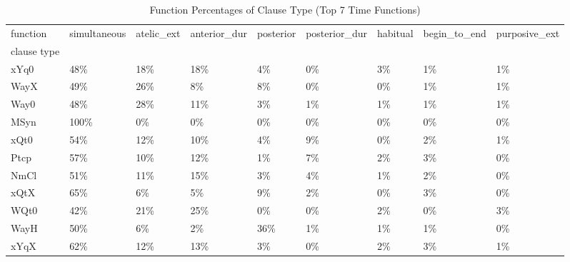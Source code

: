 \begin{table}[htbp!]
\centering
\caption{Function Percentages of Clause Type (Top 7 Time Functions)}
\label{table:type_function_pr}
\begin{adjustbox}{width=1\textwidth}
\begin{tabular}{lllllllll}
\toprule
function & simultaneous & atelic\_ext & anterior\_dur & posterior & posterior\_dur & habitual & begin\_to\_end & purposive\_ext \\
clause type &              &            &              &           &               &          &              &               \\
\midrule
xYq0        &          48\% &        18\% &          18\% &        4\% &            0\% &       3\% &           1\% &            1\% \\
WayX        &          49\% &        26\% &           8\% &        8\% &            0\% &       0\% &           1\% &            1\% \\
Way0        &          48\% &        28\% &          11\% &        3\% &            1\% &       1\% &           1\% &            1\% \\
MSyn        &         100\% &         0\% &           0\% &        0\% &            0\% &       0\% &           0\% &            0\% \\
xQt0        &          54\% &        12\% &          10\% &        4\% &            9\% &       0\% &           2\% &            1\% \\
Ptcp        &          57\% &        10\% &          12\% &        1\% &            7\% &       2\% &           3\% &            0\% \\
NmCl        &          51\% &        11\% &          15\% &        3\% &            4\% &       1\% &           2\% &            0\% \\
xQtX        &          65\% &         6\% &           5\% &        9\% &            2\% &       0\% &           3\% &            0\% \\
WQt0        &          42\% &        21\% &          25\% &        0\% &            0\% &       2\% &           0\% &            3\% \\
WayH        &          50\% &         6\% &           2\% &       36\% &            1\% &       1\% &           1\% &            0\% \\
xYqX        &          62\% &        12\% &          13\% &        3\% &            0\% &       2\% &           3\% &            1\% \\

\end{tabular}
\end{adjustbox}
\end{table}
